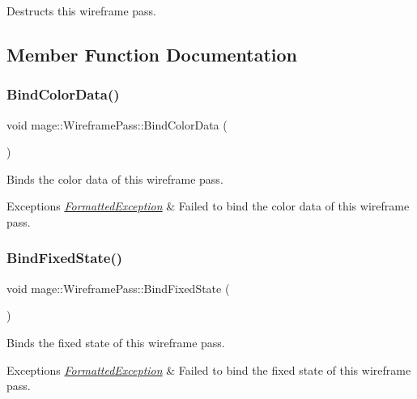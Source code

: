 Destructs this wireframe pass. 

\subsection{Member Function Documentation}
\hypertarget{classmage_1_1_wireframe_pass_a574897c1274585057e8d44070409b7e3}{}\label{classmage_1_1_wireframe_pass_a574897c1274585057e8d44070409b7e3} 
\subsubsection{\texorpdfstring{Bind\+Color\+Data()}{BindColorData()}}
{\footnotesize\ttfamily void mage\+::\+Wireframe\+Pass\+::\+Bind\+Color\+Data (\begin{DoxyParamCaption}{ }\end{DoxyParamCaption})\hspace{0.3cm}{\ttfamily [private]}}

Binds the color data of this wireframe pass.


\begin{DoxyExceptions}{Exceptions}
{\em \hyperlink{classmage_1_1_formatted_exception}{Formatted\+Exception}} & Failed to bind the color data of this wireframe pass. \\
\hline
\end{DoxyExceptions}
\hypertarget{classmage_1_1_wireframe_pass_abf99690ae099ed0ba0ca35c5d87ac0ef}{}\label{classmage_1_1_wireframe_pass_abf99690ae099ed0ba0ca35c5d87ac0ef} 
\subsubsection{\texorpdfstring{Bind\+Fixed\+State()}{BindFixedState()}}
{\footnotesize\ttfamily void mage\+::\+Wireframe\+Pass\+::\+Bind\+Fixed\+State (\begin{DoxyParamCaption}{ }\end{DoxyParamCaption})}

Binds the fixed state of this wireframe pass.


\begin{DoxyExceptions}{Exceptions}
{\em \hyperlink{classmage_1_1_formatted_exception}{Formatted\+Exception}} & Failed to bind the fixed state of this wireframe pass. \\
\hline
\end{DoxyExceptions}
\hypertarget{classmage_1_1_wireframe_pass_a6e316eaabf3afb71162490c1f3c244f3}{}\label{classmage_1_1_wireframe_pass_a6e316eaabf3afb71162490c1f3c244f3} 
